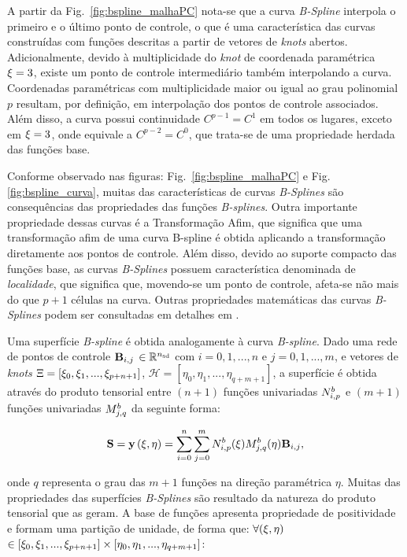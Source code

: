 \documentclass[tese_patricia]{subfiles}
\begin{document}
A partir da Fig.~\ref{fig:bspline_malhaPC} nota-se que a curva \textit{B-Spline} interpola o primeiro e o último ponto de controle, o que é uma característica das curvas construídas com funções descritas a partir de vetores de \textit{knots} abertos. Adicionalmente, devido à multiplicidade do \textit{knot} de coordenada paramétrica $\xi=3$, existe um ponto de controle intermediário também interpolando a curva. 
Coordenadas paramétricas com multiplicidade maior ou igual ao grau polinomial $p$ resultam, por definição, em interpolação dos pontos de controle associados.
Além disso, a curva possui continuidade $C^{p-1} = C^{1}$ em todos os lugares, exceto em $\xi = 3$, onde equivale a $C^{p-2} = C^{0}$, que trata-se de uma propriedade herdada das funções base.

Conforme observado nas figuras: Fig.~\ref{fig:bspline_malhaPC} e Fig. \ref{fig:bspline_curva}, muitas das características de curvas \textit{B-Splines} são consequências das propriedades das funções \textit{B-splines}. Outra importante propriedade dessas curvas é a Transformação Afim, que significa que uma transformação afim de uma curva B-spline é obtida aplicando a transformação diretamente aos pontos de controle. Além disso, devido ao suporte compacto das funções base, as curvas \textit{B-Splines} possuem característica denominada de \textit{localidade}, que significa que, movendo-se um ponto de controle, afeta-se não mais do que $p+1$ células na curva. Outras propriedades matemáticas das curvas \textit{B-Splines} podem ser consultadas em detalhes em .

Uma superfície \textit{B-spline} é obtida analogamente à curva \textit{B-spline}. Dado uma rede de pontos de controle $\mathbf{B}_{i,j}$ $\in \mathbb{R}^{{n_{\mathrm{sd}}}}$ com $i = 0,1,...,n$ e $j = 0,1,..., m$, e vetores de \textit{knots} $\Xi = \left[\xi_{0},\xi_{1},...,\xi_{p+n+1}\right]$, $\mathcal{H} = \left[\eta_{0},\eta_{1},...,\eta_{q+m+1}\right]$, a superfície é obtida através do produto tensorial entre $(n+1)$ funções univariadas $N^b_{i,p}$ e $(m+1)$ funções univariadas $M^b_{j,q}$ da seguinte forma:

\begin{align}
\mathbf{S} = \mathbf{y}\left(\xi,\eta\right)  = \sum_{i=0}^{n}\sum_{j=0}^{m}N^b_{i,p}(\xi)M^b_{j,q}(\eta)\mathbf{B}_{i,j},
\end{align}

\noindent onde $q$ representa o grau das $m+1$ funções na direção paramétrica $\eta$. 
Muitas das propriedades das superfícies \textit{B-Splines} são resultado da natureza do produto tensorial que as geram. A base de funções apresenta propriedade de positividade e formam uma partição de unidade, de forma que: $\forall(\xi,\eta)$ $\in \left[\xi_{0},\xi_{1},...,\xi_{p+n+1}\right] \times  \left[\eta_{0},\eta_{1},...,\eta_{q+m+1}\right]$:
\end{document}
